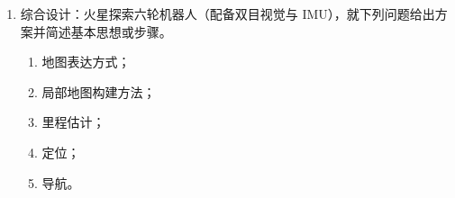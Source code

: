 \documentclass[../main.tex]{subfiles}
\begin{document}
\begin{itemize}
\begin{enumerate}
{{{        \textbf{不同点：}
        \begin{itemize}
          \item \textbf{数据结构}：PRM构建图，多次查询；RRT构建树，单次查询。
          \item \textbf{扩展策略}：PRM先采样后邻近连边，RRT从最近节点向随机样本单向扩展。
          \item \textbf{动态适用性}：PRM不适用动态环境；RRT适用于动态环境。
        \end{itemize}
        
        \textbf{完备性（概率完备性）方式：}
        \begin{itemize}
          \item \textbf{PRM：} 随着采样数量增多并按合理规则连边、且局部连线成功概率非零，采样会覆盖自由空间；若可行路径存在，找到解的概率会逐步逼近 1。
          \item \textbf{RRT：} 在均匀采样与有限步长扩展且局部扩展成功概率非零的前提下，所有可达区域都会被逐步探索；若可行路径存在，找到解的概率会随迭代次数增加而趋近 1。
        \end{itemize}
        }}}
        \item 综合设计：火星探索六轮机器人（配备双目视觉与 IMU），就下列问题给出方案并简述基本思想或步骤。
        \begin{enumerate}
            \item 地图表达方式；
            \item 局部地图构建方法；
            \item 里程估计；
            \item 定位；
            \item 导航。
        \end{enumerate}
        {\small{}}


\end{enumerate}
\end{itemize}
\end{document}
